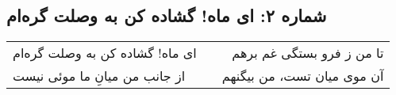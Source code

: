 \begin{center}
\section*{شماره ۲: ای ماه! گشاده کن به وصلت گره‌ام}
\label{sec:002}
\begin{longtable}{l p{0.5cm} r}
ای ماه! گشاده کن به وصلت گره‌ام
&&
تا من ز فرو بستگی غم برهم
\\
از جانب من میانِ ما موئی نیست
&&
آن موی میان تست، من بیگنهم
\\
\end{longtable}
\end{center}
